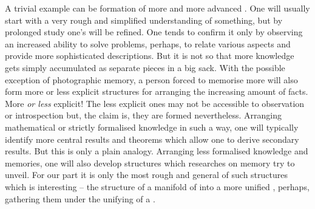 
\pa A trivial example can be formation of more and more advanced .
One will usually start with a very rough and simplified understanding of
something, but by prolonged study one's  will be refined.  One
tends to confirm it only by observing an increased ability to solve 
problems, perhaps, to relate various aspects and provide more sophisticated
 descriptions.  But it is not so that more knowledge gets simply
accumulated as separate pieces in a big sack.  With the possible exception of
photographic memory, a person forced to memorise more will also form more or
less explicit structures for arranging the increasing amount of facts.  More
{\em or less} explicit!  The less explicit ones may not be accessible to
observation or introspection but, the claim is, they are formed nevertheless.
Arranging mathematical or strictly formalised knowledge in such a way, one will
typically identify more central results and theorems which allow one to derive
secondary results.  But this is only a plain  analogy.  Arranging
less formalised knowledge and memories, one will also develop structures which
researches on memory try to unveil.  For our part it is only the most rough and
general of such structures which is interesting -- the structure of
 a manifold of  into a more unified \nexus,
perhaps, gathering them under the unifying  of a .

